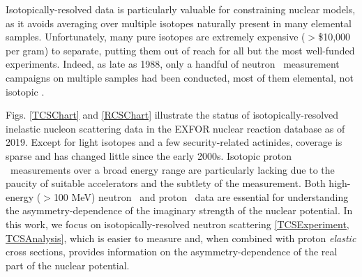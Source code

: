 Isotopically-resolved data is particularly valuable for constraining nuclear
models, as it avoids averaging over multiple isotopes naturally present in many elemental samples.
Unfortunately, many pure isotopes are extremely expensive ($>$\$10,000 per gram) to
separate, putting them out of reach for all but the most well-funded experiments.
Indeed, as late as 1988, only a handful of neutron \tot\ measurement campaigns
on multiple samples had been conducted, most of them elemental, not isotopic
\cite{BrookhavenBook1988}.

Figs. \ref{TCSChart} and \ref{RCSChart} illustrate the status of isotopically-resolved inelastic
nucleon scattering data in the EXFOR nuclear reaction database as of 2019.
Except for light isotopes and a few security-related actinides, coverage is
sparse and has changed little since the early 2000s. Isotopic proton \rxn\ measurements over
a broad energy range are particularly lacking due to the paucity of suitable
accelerators and the subtlety of the measurement. 
Both high-energy ($>$100 MeV) neutron \tot\ and proton \rxn\ data are essential for
understanding the asymmetry-dependence of the imaginary strength of the nuclear potential.
In this work, we focus on isotopically-resolved neutron scattering
\ref{TCSExperiment, TCSAnalysis}, which
is easier to measure and, when combined with proton \textit{elastic} cross sections,
provides information on the asymmetry-dependence of the real part of the nuclear potential.

